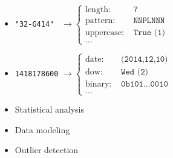 \begin{block}{}
  \begin{itemize}
  	\item \texttt{"32-G414"~} $\longrightarrow
  	  \begin{cases}
  	  	\text{length: } & \texttt{7}\\
  	  	\text{pattern: } & \texttt{NNPLNNN}\\
  	  	\text{uppercase: } & \texttt{True (1)}\\
  	  	\ldots
  	  \end{cases}$
  	  
    	\item \texttt{1418178600} $\longrightarrow
  	  \begin{cases}
    	  	\text{date: } & \texttt{(2014,12,10)}\\
    	  	\text{dow: } & \texttt{Wed (2)}\\
    	  	\text{binary: } & \texttt{0b101...0010}\\
    	  	\ldots
  	  \end{cases}$
  \end{itemize}
  
  
	\begin{itemize}
		\item Statistical analysis
		\item Data modeling
		\item Outlier detection
	\end{itemize}
\end{block}

